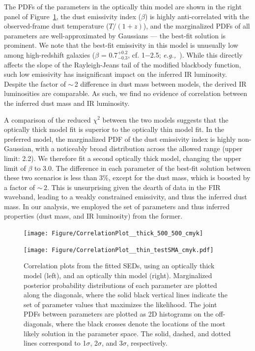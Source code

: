\documentclass[twocolumn,apj,numberedappendix]{emulateapj}
\newcommand{\eg}{{\sl e.g.,~}}
\begin{document}
The PDFs of the parameters in the optically thin model are shown in the right panel of Figure~\ref{fig:sedlikelihood}, the dust emissivity index ($\beta$) is highly anti-correlated with the observed-frame dust temperature ($T/(1+z)$), and the marginalized PDFs of all parameters are well-approximated by Gaussians --- the best-fit solution is prominent.
We note that the best-fit emissivity in this model is unusually low among high-redshift galaxies ($\beta$ = 0.7$^{+0.2}_{-0.3}$, cf. 1$-$2.5; \eg \citealt[][and references therein]{Casey12a}). While this directly affects the slope of the Rayleigh-Jeans tail of the modified blackbody function, such low emissivity has insignificant impact on the inferred IR luminosity.
Despite the factor of $\sim$\,2 difference
in dust mass
between models, the derived IR luminosities are comparable. As such, we find no evidence of correlation between the inferred dust mass and IR luminosity. 

A comparison of the reduced $\chi^2$ between the two models suggests that the optically thick model fit is superior to the optically thin model fit. In the preferred model, the marginalized PDF of the dust emissivity index is highly non-Gaussian, with a noticeably broad distribution across
the allowed range (upper limit: 2.2). We therefore fit a second optically thick model, changing the upper limit of $\beta$ to 3.0. The difference in each
parameter of the best-fit solution between these two scenarios is less than 3\%, except for the dust mass, which is boosted by a factor of $\sim$\,2. This is
unsurprising given the dearth of data in the FIR waveband, leading to a weakly constrained emissivity, and thus the inferred dust mass.
In our analysis, we employed the set of parameters and thus inferred properties (dust mass, and IR luminosity) from the former.


\begin{figure}[!tbph]
\centering
\begin{minipage}{0.5\textwidth}
\hspace{-1cm}
\texttt{[image: Figure/CorrelationPlot\_\_thick\_500\_500\_cmyk]}
\end{minipage}
\hspace{-0.9cm}
\begin{minipage}{0.5\textwidth}
\texttt{[image: Figure/CorrelationPlot\_\_thin\_testSMA\_cmyk.pdf]}
\end{minipage}
\caption{Correlation plots from the fitted SEDs, using an optically thick
model (left), and an optically thin model (right). Marginalized posterior probability
distributions of each
parameter are plotted along the diagonals, where the solid black vertical lines indicate the set of parameter values that maximizes the likelihood. The joint PDFs between parameters are plotted as 2D histograms on the off-diagonals, where the black crosses denote the
locations of the most likely solution in the parameter space. The solid, dashed, and dotted lines correspond to 1$\sigma$, 2$\sigma$, and $3\sigma$, respectively. 
\label{fig:sedlikelihood}}
\end{figure}
\end{document}
